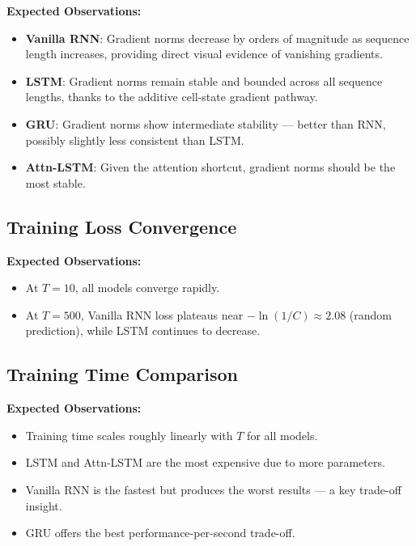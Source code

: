 \documentclass[12pt, a4paper]{article}
\begin{document}
\textbf{Expected Observations:}
\begin{itemize}[leftmargin=2em]
    \item \textbf{Vanilla RNN}: Gradient norms decrease by orders of magnitude as sequence length increases, providing direct visual evidence of vanishing gradients.
    \item \textbf{LSTM}: Gradient norms remain stable and bounded across all sequence lengths, thanks to the additive cell-state gradient pathway.
    \item \textbf{GRU}: Gradient norms show intermediate stability — better than RNN, possibly slightly less consistent than LSTM.
    \item \textbf{Attn-LSTM}: Given the attention shortcut, gradient norms should be the most stable.
\end{itemize}

\subsection{Training Loss Convergence}


\textbf{Expected Observations:}
\begin{itemize}[leftmargin=2em]
    \item At $T=10$, all models converge rapidly.
    \item At $T=500$, Vanilla RNN loss plateaus near $-\ln(1/C) \approx 2.08$ (random prediction), while LSTM continues to decrease.
\end{itemize}

\subsection{Training Time Comparison}


\textbf{Expected Observations:}
\begin{itemize}[leftmargin=2em]
    \item Training time scales roughly linearly with $T$ for all models.
    \item LSTM and Attn-LSTM are the most expensive due to more parameters.
    \item Vanilla RNN is the fastest but produces the worst results — a key trade-off insight.
    \item GRU offers the best performance-per-second trade-off.
\end{itemize}
\end{document}
